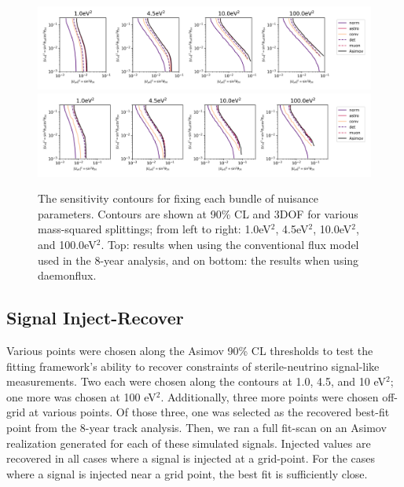 \documentclass[main.tex]{subfiles}
\begin{document}
\begin{figure}
    \centering
    \includegraphics[width=0.95\linewidth]{figures/systematic_impact_joint.png}\\
    \includegraphics[width=0.95\linewidth]{figures/Systematic_impact_joint_daemon.png}
    \caption{The sensitivity contours for fixing each bundle of nuisance parameters. Contours are shown at 90\% CL and 3DOF for various mass-squared splittings; from left to right: 1.0eV$^{2}$, 4.5eV$^{2}$, 10.0eV$^{2}$, and 100.0eV$^{2}$. Top: results when using the conventional flux model used in the 8-year analysis, and on bottom: the results when using daemonflux.}\label{fig:impact}
\end{figure}

\subsection{Signal Inject-Recover}

Various points were chosen along the Asimov 90\% CL thresholds to test the fitting framework's ability to recover constraints of sterile-neutrino signal-like measurements. 
Two each were chosen along the contours at 1.0, 4.5, and 10 eV$^{2}$; one more was chosen at 100 eV$^{2}$. 
Additionally, three more points were chosen off-grid at various points.
Of those three, one was selected as the recovered best-fit point from the 8-year track analysis. 
Then, we ran a full fit-scan on an Asimov realization generated for each of these simulated signals. 
Injected values are recovered in all cases where a signal is injected at a grid-point. 
For the cases where a signal is injected near a grid point, the best fit is sufficiently close.
\end{document}

